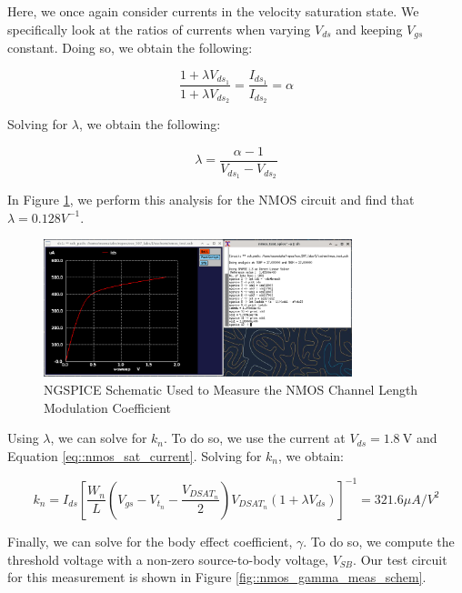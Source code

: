 \documentclass[fleqn]{article}
\begin{document}
	\noindent Here, we once again consider currents in the velocity saturation state. We specifically look at the ratios of currents when varying $V_{ds}$ and keeping $V_{gs}$ constant. Doing so, we obtain the following:
	
	\begin{equation}
		\frac{1 + {\lambda}V_{ds_1}}{1 + {\lambda}V_{ds_2}} = \frac{I_{ds_1}}{I_{ds_2}} = \alpha
	\end{equation}
	
	\noindent Solving for $\lambda$, we obtain the following:
	
	\begin{equation}
		\lambda = \frac{\alpha - 1}{V_{ds_1} - V_{ds_2}}
	\end{equation}
	
	\noindent In Figure \ref{fig::nmos_lambda_meas}, we perform this analysis for the NMOS circuit and find that $\lambda = 0.128 V^{-1}$.
	
	\begin{figure}[H]
		\centerline{\includegraphics[width=0.8\textwidth]{nmos_lambda_meas.png}}
		\caption{NGSPICE Schematic Used to Measure the NMOS Channel Length Modulation Coefficient}
		\label{fig::nmos_lambda_meas}
	\end{figure}
	
	\noindent Using $\lambda$, we can solve for $k_n$. To do so, we use the current at $V_{ds}=1.8\ \text{V}$ and Equation \ref{eq::nmos_sat_current}. Solving for $k_n$, we obtain:
	
	\begin{equation}
		k_n = I_{ds}\left[\frac{W_n}{L}\left(V_{gs} - V_{t_n} - \frac{V_{DSAT_n}}{2}\right)V_{DSAT_n}(1 + {\lambda}V_{ds})\right]^{-1} = 321.6 {\mu}A/V^2
	\end{equation}
	
	Finally, we can solve for the body effect coefficient, $\gamma$. To do so, we compute the threshold voltage with a non-zero source-to-body voltage, $V_{SB}$. Our test circuit for this measurement is shown in Figure \ref{fig::nmos_gamma_meas_schem}.
	
\end{document}
